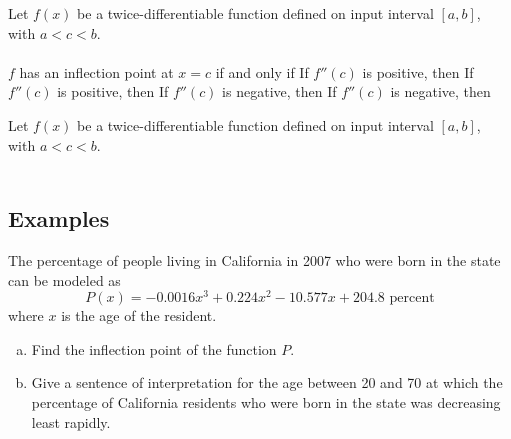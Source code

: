 \documentclass[notes]{subfiles}
\begin{document}
		\begin{thm}
			Let $f(x)$ be a twice-differentiable function defined on input interval $[a,b]$, with $a < c < b$.  \\$ $ \\
				\tabitem $f$ has an inflection point at $x = c$ if and only if 
				\tabitem If $f''(c)$ is positive, then 
				\tabitem If $f''(c)$ is positive, then 
				\tabitem If $f''(c)$ is negative, then 
				\tabitem If $f''(c)$ is negative, then 
				
		\end{thm}
		\begin{thm}
			Let $f(x)$ be a twice-differentiable function defined on input interval $[a,b]$, with $a < c < b$.\\$ $\\
					\tabitem {}
					\tabitem {}
		\end{thm}
			\newpage
			
	\subsection*{Examples}
		\begin{ex} 
			The percentage of people living in California in 2007 who were born in the state can be modeled as
			\[P(x) = -0.0016x^3 + 0.224x^2-10.577x + 204.8\text{ percent}\]
			where $x$ is the age of the resident.
			\begin{enumerate}[(a)]
				\item Find the inflection point of the function $P$.
					
				\item Give a sentence of interpretation for the age between 20 and 70 at which the percentage of California residents who were born in the state was decreasing least rapidly.
					
			\end{enumerate}
		\end{ex}
		
\end{document}
